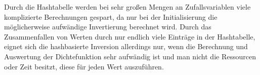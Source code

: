 Durch die Hashtabelle werden bei sehr großen Mengen an Zufallsvariablen viele 
komplizierte Berechnungen gespart, da nur bei der Initialisierung die 
möglicherweise aufwändige Invertierung berechnet wird. Durch das Zusammenfallen 
von Werten durch nur endlich viele Einträge in der Hashtabelle, eignet sich die 
hashbasierte Inversion allerdings nur, wenn die Berechnung und Auswertung der 
Dichtefunktion sehr aufwändig ist und man nicht die Ressourcen oder Zeit besitzt, 
diese für jeden Wert auszuführen.

